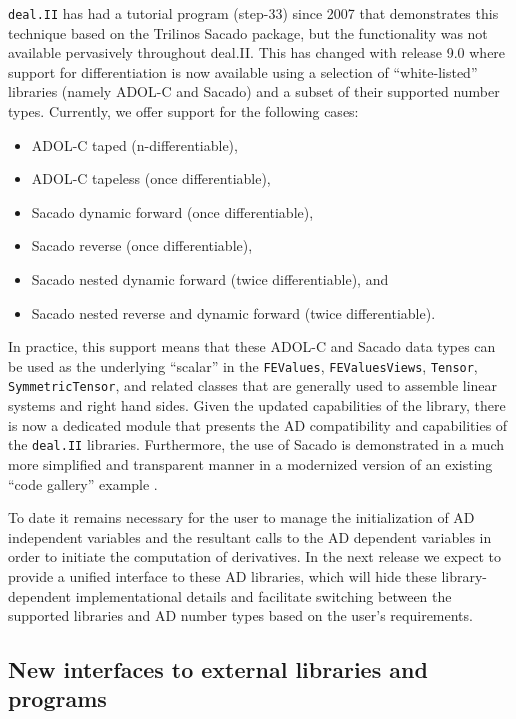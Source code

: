 \documentclass{ansarticle-preprint}
\newcommand{\specialword}[1]{\texttt{#1}}
\newcommand{\dealii}{{\specialword{deal.II}}\xspace}
\begin{document}
\dealii has had a tutorial program (step-33) since 2007 that
demonstrates this technique based on the Trilinos Sacado \cite{Bartlett2006a} package, but
the functionality was not available pervasively throughout
deal.II.
This has changed with release 9.0 where support for differentiation is
now available
using a selection of ``white-listed'' libraries (namely ADOL-C \citep{Griewank1996a}
and Sacado) and a subset of their supported number types. Currently,
we offer support for the following cases:
\begin{itemize}
\item ADOL-C taped (n-differentiable),
\item ADOL-C tapeless (once differentiable),
\item Sacado dynamic forward (once differentiable),
\item Sacado reverse (once differentiable),
\item Sacado nested dynamic forward (twice differentiable), and
\item Sacado nested reverse and dynamic forward (twice differentiable).
\end{itemize}
In practice, this support means that these ADOL-C and Sacado data
types can be used as the underlying ``scalar'' in the \texttt{FEValues}, \texttt{FEValuesViews},
\texttt{Tensor}, \texttt{SymmetricTensor},
and related classes that are generally used to assemble linear systems
and right hand sides.
Given the updated capabilities of the library, there is now a dedicated module
that presents the AD compatibility and capabilities of the \dealii libraries.
Furthermore, the use of Sacado is demonstrated in a much more simplified
and transparent manner in a modernized version of an existing ``code gallery''
example \cite{Pelteret2016a}.

To date it remains necessary for the user  to manage the initialization of AD
independent variables and the resultant calls  to the AD dependent variables
in order to initiate the computation of derivatives.
In the next release we expect to provide a unified interface to these
AD libraries, which will hide these library-dependent implementational details
and facilitate switching between the supported libraries and AD number types
based on the user's requirements.


\subsection{New interfaces to external libraries and programs}
\end{document}
